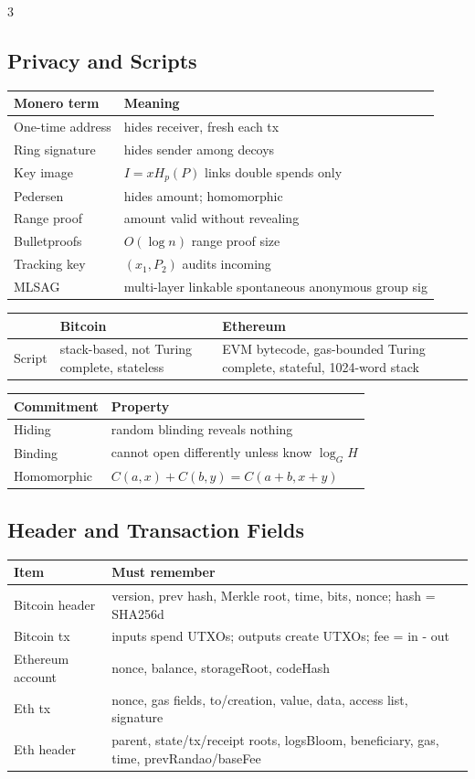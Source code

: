 \documentclass[8pt]{extarticle}
\begin{document}
\begin{multicols*}{3}
\subsection{Privacy and Scripts}
\begin{tabularx}{\linewidth}{@{}lX@{}}
\toprule
Monero term & Meaning\\
\midrule
One-time address & hides receiver, fresh each tx\\
Ring signature & hides sender among decoys\\
Key image & $I=xH_p(P)$ links double spends only\\
Pedersen & hides amount; homomorphic\\
Range proof & amount valid without revealing\\
Bulletproofs & $O(\log n)$ range proof size\\
Tracking key & $(x_1,P_2)$ audits incoming\\
MLSAG & multi-layer linkable spontaneous anonymous group sig\\
\bottomrule
\end{tabularx}
\begin{tabularx}{\linewidth}{@{}lXX@{}}
\toprule
 & Bitcoin & Ethereum\\
\midrule
Script & stack-based, not Turing complete, stateless & EVM bytecode, gas-bounded Turing complete, stateful, 1024-word stack\\
\bottomrule
\end{tabularx}
\begin{tabularx}{\linewidth}{@{}lX@{}}
\toprule
Commitment & Property\\
\midrule
Hiding & random blinding reveals nothing\\
Binding & cannot open differently unless know $\log_GH$\\
Homomorphic & $C(a,x)+C(b,y)=C(a+b,x+y)$\\
\bottomrule
\end{tabularx}

\subsection{Header and Transaction Fields}
\begin{tabularx}{\linewidth}{@{}lX@{}}
\toprule
Item & Must remember\\
\midrule
Bitcoin header & version, prev hash, Merkle root, time, bits, nonce; hash = SHA256d\\
Bitcoin tx & inputs spend UTXOs; outputs create UTXOs; fee = in - out\\
Ethereum account & nonce, balance, storageRoot, codeHash\\
Eth tx & nonce, gas fields, to/creation, value, data, access list, signature\\
Eth header & parent, state/tx/receipt roots, logsBloom, beneficiary, gas, time, prevRandao/baseFee\\
\bottomrule
\end{tabularx}


\end{multicols*}
\end{document}
